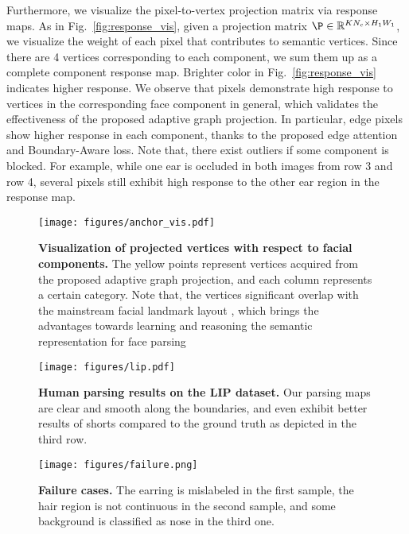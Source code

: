 Furthermore, we visualize the pixel-to-vertex projection matrix via response maps. 
As in Fig.~\ref{fig:response_vis}, given a projection matrix $\P \in \mathbb{R}^{KN_c \times H_1W_1}$, we visualize the weight of each pixel that contributes to semantic vertices. Since there are 4 vertices corresponding to each component, we sum them up as a complete component response map.
Brighter color in Fig.~\ref{fig:response_vis} indicates higher response. 
We observe that pixels demonstrate high response to vertices in the corresponding face component in general, which validates the effectiveness of the proposed adaptive graph projection.   
In particular, edge pixels show higher response in each component, thanks to the proposed edge attention and Boundary-Aware loss. 
Note that, there exist outliers if some component is blocked. For example, while one ear is occluded in both images from row 3 and row 4, several pixels still exhibit high response to the other ear region in the response map.

\begin{figure}[tbp]
    \centering
    \texttt{[image: figures/anchor\_vis.pdf]}
    \caption{\textbf{Visualization of projected vertices with respect to facial components.} The yellow points represent vertices acquired from the proposed adaptive graph projection, and each column represents a certain category. Note that, the vertices significant overlap with the mainstream facial landmark layout \cite{liu2019grand, wu2018look}, which brings the advantages towards learning and reasoning the semantic representation for face parsing}
    \label{fig:anchor_vis}
\end{figure}




\begin{figure}[tbp]
    \centering
    \texttt{[image: figures/lip.pdf]}
    \caption{\textbf{Human parsing results on the LIP dataset.} Our parsing maps are clear and smooth along the boundaries, and even exhibit better results of shorts compared to the ground truth as depicted in the third row.}
    \label{fig:lip}
\end{figure}

\begin{figure}
    \centering
    \texttt{[image: figures/failure.png]}
    \caption{\textbf{Failure cases.} The earring is mislabeled in the first sample, the hair region is not continuous in the second sample, and some background is classified as nose in the third one.}
    \label{fig:failure}
\end{figure}


